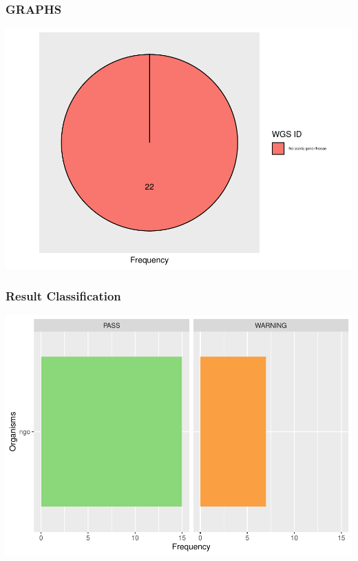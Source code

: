 \documentclass[
  a4paper,
]{article}
\begin{document}
\subsubsection{GRAPHS}\label{graphs}

\fontsize{7}{8}
\selectfont
\captionsetup[table]{labelformat=empty}
\renewcommand{\arraystretch}{1.2}

\includegraphics{qualifyr_report_2024-07-31_files/figure-latex/pie_chart-1.pdf}

\subsubsection{Result Classification}\label{result-classification}

\includegraphics{qualifyr_report_2024-07-31_files/figure-latex/organism results-1.pdf}
\end{document}
